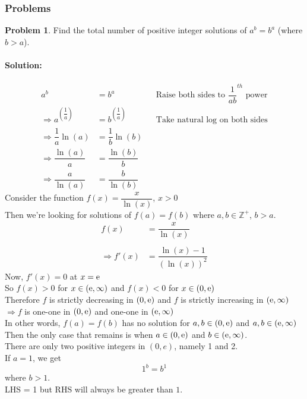 \documentclass[14]{article}
\theoremstyle{definition}
\newtheorem{prob}{Problem}
\begin{document}
\subsubsection{Problems}
\begin{prob}
Find the total number of positive integer solutions of $a^b = b^a$ (where $b>a$).
\end{prob}
\paragraph{Solution:}
\begin{align*}
a^b &= b^a && \text{Raise both sides to } \dfrac1{ab}^{th}\text{ power}\\
\Rightarrow a^{\left(\dfrac{1}{a}\right)} &= b^{\left(\dfrac{1}{a}\right)} && \text{Take natural log  on both sides}\\
\Rightarrow \dfrac{1}{a} \ln(a) &= \dfrac{1}{b} \ln(b)\\
\Rightarrow \dfrac{\ln(a)}{a} &= \dfrac{\ln(b)}{b}\\
\Rightarrow \dfrac{a}{\ln(a)} &= \dfrac{b}{\ln(b)}
\end{align*}
Consider the function $f(x) = \dfrac{x}{\ln(x)}$, $x > 0$\\
Then we're looking for solutions of $f(a) = f(b)$ where $a, b \in \mathbb{Z}^+$, $b > a$.
\begin{align*}
f(x) &= \dfrac{x}{\ln(x)}\\\\
\Rightarrow f'(x) &= \dfrac{\ln(x) - 1}{(\ln(x))^2}
\end{align*}
Now, $f'(x) = 0$ at $x = {\rm e}$\\
So $f(x) > 0$ for $x \in ( {\rm e}, \infty)$ and $f(x) < 0$ for $x \in (0, {\rm e})$\\
Therefore $f$ is strictly decreasing in $(0, {\rm e})$ and $f$ is strictly increasing in $({\rm e}, \infty)$\\
$\Rightarrow f$ is one-one in $(0, {\rm e})$ and one-one in $({\rm e}, \infty)$\\
In other words, $f(a) = f(b)$ has no solution for $a, b \in (0, {\rm e})$ and $a, b \in ({\rm e}, \infty)$\\
Then the only case that remains is when $a \in (0, {\rm e})$ and $b \in ({\rm e}, \infty)$.\\
There are only two positive integers in $(0, e)$, namely 1 and 2.\\
If $a = 1$, we get
\[1^b = b ^1\]
where $b > 1$.\\
LHS = 1 but RHS will always be greater than $1$.\\
\end{document}
